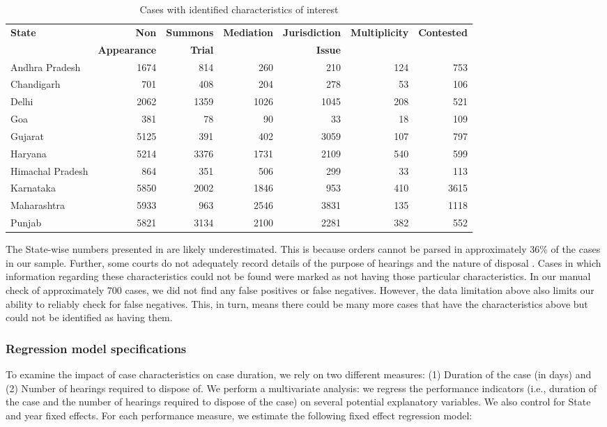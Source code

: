 \documentclass[12pt,a4paper]{article}
\begin{document}
{\footnotesize
 \begin{longtable}{@{}lrrrrrr@{}}
 \caption{Cases with identified characteristics of interest}
 \label{tab:case_chars}\\
 \toprule
 \textbf{State} & \textbf{Non} & \textbf{Summons} & \textbf{Mediation} & \textbf{Jurisdiction} & \textbf{Multiplicity} & \textbf{Contested} \\
 & \textbf{Appearance} & \textbf{Trial} & & \textbf{Issue} & &\\
 \midrule
 \endhead
 Andhra Pradesh & 1674 & 814 & 260 & 210 & 124 & 753 \\
 Chandigarh & 701 & 408 & 204 & 278 & 53 & 106 \\
 Delhi & 2062 & 1359 & 1026 & 1045 & 208 & 521 \\
 Goa & 381 & 78 & 90 & 33 & 18 & 109 \\
 Gujarat & 5125 & 391 & 402 & 3059 & 107 & 797 \\
 Haryana & 5214 & 3376 & 1731 & 2109 & 540 & 599 \\
 Himachal Pradesh & 864 & 351 & 506 & 299 & 33 & 113 \\
 Karnataka & 5850 & 2002 & 1846 & 953 & 410 & 3615 \\
 Maharashtra & 5933 & 963 & 2546 & 3831 & 135 & 1118 \\
 Punjab & 5821 & 3134 & 2100 & 2281 & 382 & 552 \\
 \bottomrule
\end{longtable}
}

The State-wise numbers presented in  are likely underestimated. This is because orders cannot be parsed in approximately 36\% of the cases in our sample. Further, some courts do not adequately record details of the purpose of hearings and the nature of disposal \autocite{damle2020_ecourtsData}. Cases in which information regarding these characteristics could not be found were marked as not having those particular characteristics. In our manual check of approximately 700 cases, we did not find any false positives or false negatives. However, the data limitation above also limits our ability to reliably check for false negatives. This, in turn, means there could be many more cases that have the characteristics above but could not be identified as having them.

\subsubsection{Regression model specifications} \label{sec:model-selection}
To examine the impact of case characteristics on case duration, we rely on two different measures: (1) Duration of the case (in days) and (2) Number of hearings required to dispose of. We perform a multivariate analysis: we regress the performance indicators (i.e., duration of the case and the number of hearings required to dispose of the case) on several potential explanatory variables. We also control for State and year fixed effects. For each performance measure, we estimate the following fixed effect regression model:
\end{document}

